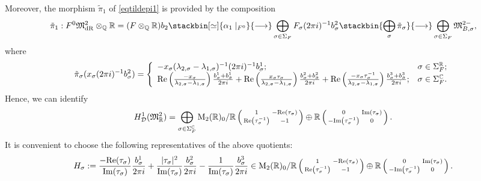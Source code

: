 \documentclass{amsart}
\theoremstyle{definition}
\theoremstyle{remark}
\numberwithin{equation}{section}
\newcommand{\M}{\mathrm{M}}
\newcommand{\mfM}{{\mathfrak M}}
\newcommand{\Q}{{\mathbb Q}}
\newcommand{\C}{{\mathbb C}}
\newcommand{\R}{{\mathbb R}}
\newcommand{\cD}{{\mathcal D}}
\begin{document}
 Moreover, the morphism $\tilde\pi_1$ of \eqref{eqtildepi1} is provided  by the composition 
  \[
  \tilde \pi_1:F^0\mfM^2_{\rm dR}\otimes_\Q\R= (F\otimes_\Q\R)b_2\stackbin[\simeq]{\alpha_1\mid_{F^0}}{\longrightarrow} \bigoplus_{\sigma\in\Sigma_F}F_\sigma (2\pi i)^{-1}b_{\sigma}^2\stackbin{\bigoplus_\sigma\tilde\pi_\sigma}{\longrightarrow} \bigoplus_{\sigma\in\Sigma_F}\mfM^{2-}_{B,\sigma},
  \]
  where
    \begin{equation*}\label{tildepisigma}
     \tilde\pi_\sigma(x_\sigma(2\pi i)^{-1}b_{\sigma}^2)=\left\{\begin{array}{ll}
         -x_\sigma(\lambda_{2,\sigma}-\lambda_{1,\sigma})^{-1}(2\pi i)^{-1}b_\sigma^1; &\sigma\in\Sigma_F^\R;  \\
        {\rm Re}\left(\frac{-x_\sigma}{\lambda_{2,\sigma}-\lambda_{1,\sigma}}\right)\frac{b_\sigma^1+b_{\bar\sigma}^1}{2\pi i}+{\rm Re}\left(\frac{x_\sigma\tau_\sigma}{\lambda_{2,\sigma}-\lambda_{1,\sigma}}\right)\frac{b_\sigma^2+b_{\bar\sigma}^2}{2\pi i}+{\rm Re}\left(\frac{-x_\sigma\tau_\sigma^{-1}}{\lambda_{2,\sigma}-\lambda_{1,\sigma}}\right)\frac{b_\sigma^3+b_{\bar\sigma}^3}{2\pi i};& \sigma\in\Sigma_F^\C.
    \end{array}\right.
    \end{equation*}
Hence,  we can identify 
\[
H^1_{\cD}(\mfM^2_\R)=\bigoplus_{\sigma\in\Sigma_F^\C}\M_2(\R)_0/\R\left(\begin{smallmatrix}1&-{\rm Re}\left(\tau_{\sigma}\right)\\{\rm Re}\left(\tau_{\sigma}^{-1}\right)&-1\end{smallmatrix}\right)\oplus \R\left(\begin{smallmatrix}0&{\rm Im}\left(\tau_{\sigma}\right)\\-{\rm Im}\left(\tau_{\sigma}^{-1}\right)&0\end{smallmatrix}\right).
\]
It is convenient to choose the following representatives of the above quotients:
\begin{equation}\label{defHsigma}
H_\sigma:=\frac{-{\rm Re}(\tau_\sigma)}{{\rm Im}(\tau_\sigma)}\frac{b_\sigma^1}{2\pi i}+\frac{|\tau_\sigma|^2}{{\rm Im}(\tau_\sigma)}\frac{b_\sigma^2}{2\pi i}-\frac{1}{{\rm Im}(\tau_\sigma)}\frac{b_\sigma^3}{2\pi i}\in\M_2(\R)_0/\R\left(\begin{smallmatrix}1&-{\rm Re}\left(\tau_{\sigma}\right)\\{\rm Re}\left(\tau_{\sigma}^{-1}\right)&-1\end{smallmatrix}\right)\oplus \R\left(\begin{smallmatrix}0&{\rm Im}\left(\tau_{\sigma}\right)\\-{\rm Im}\left(\tau_{\sigma}^{-1}\right)&0\end{smallmatrix}\right).
\end{equation}
\end{document}

